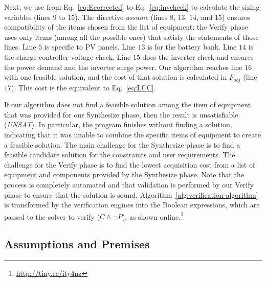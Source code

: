 \documentclass[journal]{IEEEtran}
\begin{document}
Next, we use from Eq.~\eqref{eq:Ecorrected} to Eq.~\eqref{eq:invcheck} to calculate the sizing variables (lines $9$ to $15$). The directive \textit{assume} (lines $8$, $13$, $14$, and $15$) ensures compatibility of the items chosen from the list of equipment: the {\sc Verify} phase uses only items (among all the possible ones) that satisfy the statements of those lines. Line $5$ is specific to PV panels. Line $13$ is for the battery bank. Line $14$ is the charge controller voltage check. Line $15$ does the inverter check and ensures the power demand and the inverter surge power.
Our algorithm reaches line $16$ with one feasible solution, and the cost of that solution is calculated in $F_{obj}$ (line $17$). This cost is the equivalent to Eq.~\eqref{eq:LCC}.

If our algorithm does not find a feasible solution among the item of equipment that was provided for our {\sc Synthesize} phase, then the result is unsatisfiable (\textit{UNSAT}). In particular, the program finishes without finding a solution, indicating that it was unable to combine the specific items of equipment to create a feasible solution. 
%
The main challenge for the {\sc Synthesize} phase is to find a feasible candidate solution for the constraints and user requirements. The challenge for the {\sc Verify} phase is to find the lowest acquisition cost from a list of equipment and components provided by the {\sc Synthesize} phase. 
%
Note that the process is completely automated and that validation is performed by our {\sc Verify} phase to ensure that the solution is sound.
Algorithm~\ref{alg:verification-algorithm} is transformed by the verification engines into the Boolean expressions, which are passed to the solver to verify ($C \wedge \neg P$), as shown online.\footnote{\url{http://tiny.cc/ity4nz}}

\subsection{Assumptions and Premises}
%
\end{document}
